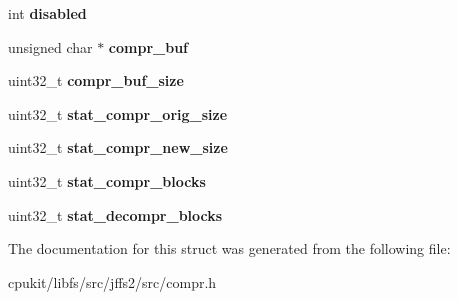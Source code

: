 \begin{DoxyCompactItemize}
int {\bfseries disabled}
\item 
\mbox{\label{structjffs2__compressor_a335433d591dbbba1e02d2f250267cba3}} 
unsigned char $\ast$ {\bfseries compr\+\_\+buf}
\item 
\mbox{\label{structjffs2__compressor_a0ed23c86798f93a5ceac09c0e6a8160c}} 
uint32\+\_\+t {\bfseries compr\+\_\+buf\+\_\+size}
\item 
\mbox{\label{structjffs2__compressor_a70ac20fa364dd3f44ed08ba5d9596c77}} 
uint32\+\_\+t {\bfseries stat\+\_\+compr\+\_\+orig\+\_\+size}
\item 
\mbox{\label{structjffs2__compressor_a247fed7ccbd938f8fe1b6dd0afb8ee9b}} 
uint32\+\_\+t {\bfseries stat\+\_\+compr\+\_\+new\+\_\+size}
\item 
\mbox{\label{structjffs2__compressor_afdfd1b22065a5c88ea3fd36b07de2c84}} 
uint32\+\_\+t {\bfseries stat\+\_\+compr\+\_\+blocks}
\item 
\mbox{\label{structjffs2__compressor_a25ff19734a67848f14018744b025fc67}} 
uint32\+\_\+t {\bfseries stat\+\_\+decompr\+\_\+blocks}
\end{DoxyCompactItemize}


The documentation for this struct was generated from the following file\+:\begin{DoxyCompactItemize}
\item 
cpukit/libfs/src/jffs2/src/compr.\+h\end{DoxyCompactItemize}
